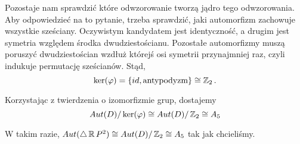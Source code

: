 Pozostaje nam sprawdzić które odwzorowanie tworzą jądro tego odwzorowania. Aby odpowiedzieć na to pytanie, trzeba sprawdzić, jaki automorfizm zachowuje wszystkie sześciany. Oczywistym kandydatem jest identyczność, a drugim jest symetria względem środka dwudziestościanu. Pozostałe automorfizmy muszą poruszyć dwudziestościan wzdłuż którejś osi symetrii przynajmniej raz, czyli indukuje permutację sześcianów. Stąd, 
$$\ker(\varphi)=\{id, \text{antypodyzm}\}\cong \operatorname{\mathbb{Z}}_2.$$

Korzystając z twierdzenia o izomorfizmie grup, dostajemy
$$Aut(D)/\ker(\varphi)\cong Aut(D)/\operatorname{\mathbb{Z}}_2\cong A_5$$

W takim razie, $Aut(\triangle \operatorname{\mathbb{R}} P^2)\cong Aut(D)/\operatorname{\mathbb{Z}}_2\cong A_5$ tak jak chcieliśmy.







%
%
%
%
%
%
